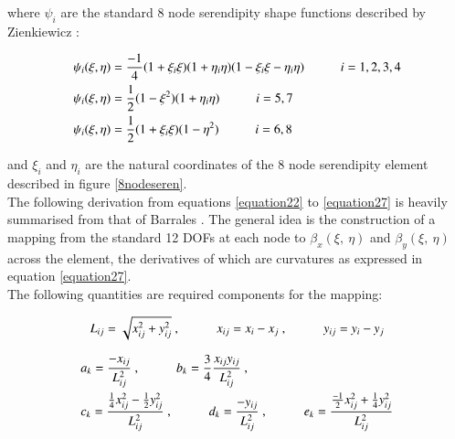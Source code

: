 where $\psi_i$ are the standard 8 node serendipity shape functions described by Zienkiewicz \cite{Zie77}:


\begin{gather} 
	\begin{aligned}
		&\psi_i (\xi , \eta) = \frac{-1}{4} (1 + \xi_i \xi)(1 + \eta_i \eta)(1 - \xi_i \xi - \eta_i \eta)
		\hspace{10mm}
		i = 1, 2, 3, 4 \\
		&\psi_i (\xi , \eta) = \frac{1}{2} (1 - \xi^2)(1 + \eta_i \eta)
		\hspace{10mm}
		i = 5, 7 \\
		&\psi_i (\xi , \eta) = \frac{1}{2} (1 + \xi_i \xi)(1 - \eta^2)
		\hspace{10mm}
		i = 6, 8
		\label{equation21}
	\end{aligned}
\end{gather}

and $\xi_i$ and $\eta_i$ are the natural coordinates of the 8 node serendipity element described in figure \ref{8nodeseren}.\\

The following derivation from equations \eqref{equation22} to \eqref{equation27} is heavily summarised from that of Barrales \cite{Bar12}. The general idea is the construction of a mapping from the standard 12 DOFs at each node to $\beta_x (\xi,\ \eta)$ and $\beta_y (\xi,\ \eta)$ across the element, the derivatives of which are curvatures as expressed in equation \eqref{equation27}.\\

The following quantities are required components for the mapping:

\begin{equation} 
L_{ij} = \sqrt{x_{ij}^2 + y_{ij}^2}\ ,
\hspace{10mm}
x_{ij} = x_i - x_j\ ,
\hspace{10mm}
y_{ij} = y_i - y_j
\label{equation22}
\end{equation}


\begin{gather} 
	\begin{aligned}
		&a_k = \frac{-x_{ij}}{L_{ij}^2}\ ,
		\hspace{10mm}
		b_k = \frac{3}{4} \frac{x_{ij} y_{ij}}{L_{ij}^2}\ , \\
		&c_k = \frac{\frac{1}{4} x_{ij}^2 - \frac{1}{2} y_{ij}^2}{L_{ij}^2}\ ,
		\hspace{10mm}
		d_k = \frac{-y_{ij}}{L_{ij}^2}\ ,
		\hspace{10mm}
		e_k = \frac{\frac{-1}{2} x_{ij}^2 + \frac{1}{4} y_{ij}^2}{L_{ij}^2}
		\label{equation23}
	\end{aligned}
\end{gather}

